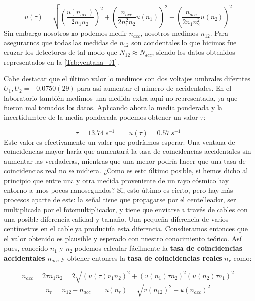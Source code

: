\documentclass[11pt]{article}
\newcommand{\parentesis}[1]{\left( #1  \right)}
\begin{document}
\begin{equation}
	u(\tau) = \sqrt{\parentesis{\frac{u(n_{acc})}{2n_1n_2}}^2+\parentesis{\frac{n_{acc}}{2n_1^2n_2} u(n_1)}^2+\parentesis{\frac{n_{acc}}{2n_1n_2^2} u(n_2)}^2}
\end{equation}
Sin embargo nosotros no podemos medir $n_{acc}$, nosotros medimos $n_{12}$. Para asegurarnos que todas las medidas de $n_{12}$ son accidentales lo que hicimos fue cruzar los detectores de tal modo que $N_{12}\approx N_{acc}$, siendo los datos obtenidos representados en la \cref{Tab:ventana_01}.

\hspace*{-1.0cm} 

Cabe destacar que el último valor lo medimos con dos voltajes umbrales diferntes $U_1,U_2=-0.0750(29)$ para así aumentar el número de accidentales. En el laboratorio también medimos una medida extra aquí no representada, ya que fueron mal tomados los datos. Aplicando ahora la media ponderada y la incertidumbre de la media ponderada podemos obtener un valor $\tau$: 

\begin{equation}
	\tau = 13.74 \ \unit{s^{-1}} \qquad  u(\tau) = 0.57  \ \unit{s^{-1}}
\end{equation}
Este valor es efectivamente un valor que podríamos esperar. Una ventana de coincidencias mayor haría que aumentará la tasa de coincidencias accidentales sin aumentar las verdaderas, mientras que una menor podría hacer que una tasa de coincidencias real no se midiera. ¿Como es esto último posible, si hemos dicho al principio que entre una y otra medida proveniente de un rayo cósmico hay entorno a unos pocos nanosegundos? Si, esto último es cierto, pero  hay más procesos aparte de este: la señal tiene que propagarse por el centelleador, ser multiplicada por el fotomultiplicador, y tiene que enviarse a través de cables con una posible diferencia calidad y tamaño. Una pequeña diferencia de varios centímetros en el cable ya produciría esta diferencia. Consdieramos entonces que el valor obtenido es plausible y esperado con nuestro conocimiento teórico.  Así pues, conocido $n_1$ y $n_2$ podemos calcular fácilmente la \textbf{tasa de coincidencias accidentales} $n_{acc}$ y obtener entonces la \textbf{tasa de coincidencias reales} $n_r$ como:

\begin{equation}
	n_{acc} = 2 \tau n_1 n_2 = 2\sqrt{(u({\tau})n_1n_2)^2 + (u(n_{1})\tau n_2)^2  (u(n_{2})\tau n_1)^2 }
\end{equation}
\begin{equation}
	n_r = n_{12} - n_{acc} \qquad u(n_r) = \sqrt{u(n_{12})^2 + u(n_{acc})^2}
\end{equation}
\end{document}
